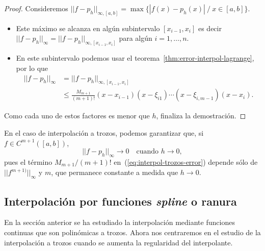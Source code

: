 \begin{proof}
  Consideremos $||f-p_h||_{\infty, [a,b]}=\max\{ |f(x)-p_h(x)|\ /\
  x\in[a,b]\}$.
  \begin{itemize}
  \item Este máximo se alcanza en algún subintervalo $[x_{i-1},x_{i}]$
    es decir $||f-p_h||_{\infty}=||f-p_h||_{\infty, [x_{i-1},x_i]}$
    para algún $i=1,\dots,n$.
  \item En este subintervalo podemos usar el
    teorema~\ref{thm:error-interpol-lagrange}, por lo que
    \begin{align*}
      ||f-p_h||_\infty &= ||f-p_h||_{\infty, [x_{i-1},x_i]}  \\
      &\le\frac{M_{m+1}}{(m+1)!}
      (x-x_{i-1})(x-\xi_{i1})\cdots(x-\xi_{i,m-1})(x-x_i).
    \end{align*}
  \end{itemize}
  Como cada uno de estos factores es menor que $h$, finaliza la
  demostración.
\end{proof}

\begin{remark}
  \label{rk:3}
  En el caso de interpolación a trozos, podemos garantizar que, si
  $f\in C^{m+1}([a,b])$,
  \begin{equation*}
    ||f-p_h||_\infty \to 0 \quad \text{cuando } h \to 0,
  \end{equation*}
  pues el término $M_{m+1}/(m+1)!$ en~(\ref{eq:interpol-trozos-error})
  depende sólo de $||f^{m+1)}||_\infty$ y $m$, que permanece constante
    a medida que $h\to 0$.
\end{remark}

\subsection{Interpolación por funciones \textit{spline} o ranura}
\label{sec:splines}

En la sección anterior se ha estudiado la interpolación mediante
funciones continuas que son polinómicas a trozos. Ahora nos
centraremos en el estudio de la interpolación a trozos cuando se
aumenta la regularidad del interpolante. 

